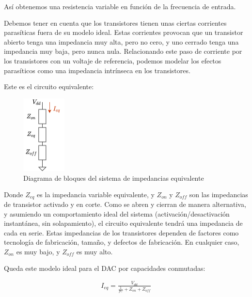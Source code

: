 \documentclass[12pt]{report} %
\begin{document}
	Así obtenemos una resistencia variable en función de la frecuencia de entrada.
	
	Debemos tener en cuenta que los transistores tienen unas ciertas corrientes parasíticas fuera de su modelo ideal. Estas corrientes provocan que un transistor abierto tenga una impedancia muy alta, pero no cero, y uno cerrado tenga una impedancia muy baja, pero nunca nula. Relacionando este paso de corriente por los transistores con un voltaje de referencia, podemos modelar los efectos parasíticos como una impedancia intrínseca en los transistores.
	
	Este es el circuito equivalente:
	\begin{figure}[H]
		\includegraphics[width=0.2\textwidth]{sw-capacities-var-res-block.png}
		\caption[Diagrama de bloques del sistema de impedancias equivalente]{Diagrama de bloques del sistema de impedancias equivalente}
		\label{fig:sw-capacities-var-res-block.png}
	\end{figure}
	
	Donde $Z_{eq}$ es la impedancia variable equivalente, y $Z_{on}$ y $Z_{off}$ son las impedancias de transistor activado y en corte. Como se abren y cierran de manera alternativa, y asumiendo un comportamiento ideal del sistema (activación/desactivación instantánea, sin solapamiento), el circuito equivalente tendrá una impedancia de cada en serie. Estas impedancias de los transistores dependen de factores como tecnología de fabricación, tamaño, y defectos de fabricación. En cualquier caso, $Z_{on}$ es muy bajo, y $Z_{off}$ es muy alto.
	
	Queda este modelo ideal para el DAC por capacidades conmutadas:
	
	\begin{figure}[H]
		\label{sw-capacities-i_eq}
		\begin{equation}
		\begin{array}{c}
		I_{eq} = \frac{V_{dd}}{\frac{1}{fC} + Z_{on} + Z_{off}} \\
		\end{array}
		\end{equation}
	\end{figure}
	
\end{document}
